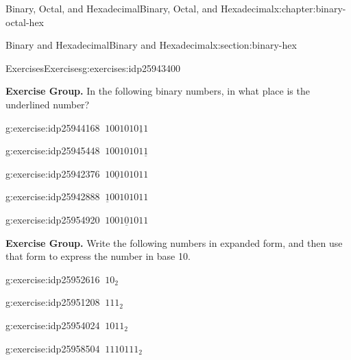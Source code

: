 \documentclass[twoside,10pt,]{book}
\numberwithin{equation}{section}
\begin{document}
\begin{chapterptx}{Binary, Octal, and Hexadecimal}{}{Binary, Octal, and Hexadecimal}{}{}{x:chapter:binary-octal-hex}
\begin{sectionptx}{Binary and Hexadecimal}{}{Binary and Hexadecimal}{}{}{x:section:binary-hex}
%
\begin{exercises-subsection}{Exercises}{}{Exercises}{}{}{g:exercises:idp25943400}
\par\medskip\noindent%
\textbf{Exercise Group.}\space\space%
In the following binary numbers, in what place is the underlined number?%
\begin{exercisegroup}
\begin{divisionexerciseeg}{1}{}{}{g:exercise:idp25944168}%
\(\ 1001010\underline{1}1\)\end{divisionexerciseeg}%
\begin{divisionexerciseeg}{2}{}{}{g:exercise:idp25945448}%
\(\ 10010101\underline{1}\)\end{divisionexerciseeg}%
\begin{divisionexerciseeg}{3}{}{}{g:exercise:idp25942376}%
\(\ 10\underline{0}101011\)\end{divisionexerciseeg}%
\begin{divisionexerciseeg}{4}{}{}{g:exercise:idp25942888}%
\(\ \underline{1}00101011\)\end{divisionexerciseeg}%
\begin{divisionexerciseeg}{5}{}{}{g:exercise:idp25954920}%
\(\ 1001\underline{0}1011\)\end{divisionexerciseeg}%
\end{exercisegroup}
\par\medskip\noindent
\par\medskip\noindent%
\textbf{Exercise Group.}\space\space%
Write the following numbers in expanded form, and then use that form to express the number in base 10.%
\begin{exercisegroup}
\begin{divisionexerciseeg}{6}{}{}{g:exercise:idp25952616}%
\(\ 10_2\)\end{divisionexerciseeg}%
\begin{divisionexerciseeg}{7}{}{}{g:exercise:idp25951208}%
\(\ 111_2\)\end{divisionexerciseeg}%
\begin{divisionexerciseeg}{8}{}{}{g:exercise:idp25954024}%
\(\ 1011_2\)\end{divisionexerciseeg}%
\begin{divisionexerciseeg}{9}{}{}{g:exercise:idp25958504}%
\(\ 1110111_2\)\end{divisionexerciseeg}%
\end{exercisegroup}
\par\medskip\noindent
\par\medskip\noindent%

\end{exercises-subsection}
\end{sectionptx}
\end{chapterptx}
\end{document}
